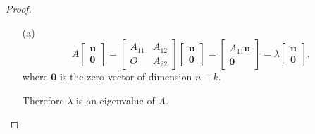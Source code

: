 \begin{proof}
  \begin{itemize}
  \item[(a)]
    \begin{displaymath}
      A
      \begin{bmatrix}
        \mathbf{u} \\
        \mathbf{0}
      \end{bmatrix}
      =
      \begin{bmatrix}
        A_{11} & A_{12} \\
        O & A_{22}
      \end{bmatrix}
      \begin{bmatrix}
        \mathbf{u} \\
        \mathbf{0} 
      \end{bmatrix}
      =
      \begin{bmatrix}
        A_{11}\mathbf{u} \\
        \mathbf{0}
      \end{bmatrix}
      = \lambda
      \begin{bmatrix}
        \mathbf{u} \\
        \mathbf{0}
      \end{bmatrix},
    \end{displaymath}
    where $\mathbf{0}$ is the zero vector of dimension $n-k$.

    Therefore $\lambda$ is an eigenvalue of $A$.


\end{itemize}
\end{proof}

